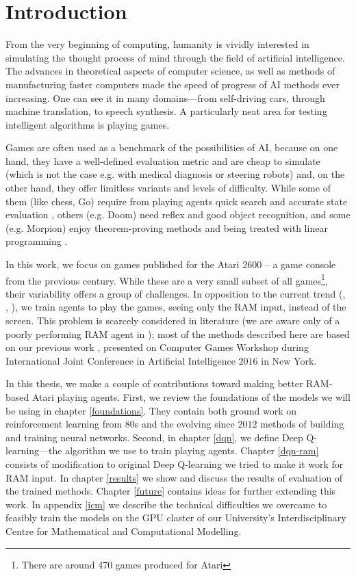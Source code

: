 \chapter*{Introduction}
From the very beginning of computing, humanity is vividly interested in simulating the thought process of mind through the field of artificial intelligence. The advances in theoretical aspects of computer science, as well as methods of manufacturing faster computers made the speed of progress of AI methods ever increasing. One can see it in many domains---from self-driving cars, through machine translation, to speech synthesis. A particularly neat area for testing intelligent algorithms is playing games.

Games are often used as a benchmark of the possibilities of AI, because on one hand, they have a well-defined evaluation metric and are cheap to simulate (which is not the case e.g. with medical diagnosis or steering robots) and, on the other hand, they offer limitless variants and levels of difficulty. While some of them (like chess, Go) require from playing agents quick search and accurate state evaluation \cite{alphago}, others (e.g. Doom) need reflex and good object recognition, and some (e.g. Morpion) enjoy theorem-proving methods and being treated with linear programming \cite{morpion}.


In this work, we focus on games published for the Atari 2600 -- a game console from the previous century. While these are a very small subset of all games\footnote{There are around 470 games produced for Atari}, their variability offers a group of challenges. In opposition to the current trend (\cite{nips-dqn}, \cite{nature-dqn}, \cite{a3c}), we train agents to play the games, seeing only the RAM input, instead of the screen. This problem is scarcely considered in literature (we are aware only of a poorly performing RAM agent in \cite{ale}); most of the methods described here are based on our previous work \cite{our-paper}, presented on Computer Games Workshop during International Joint Conference in Artificial Intelligence $2016$ in New York.

In this thesis, we make a couple of contributions toward making better RAM-based Atari playing agents. First, we review the foundations of the models we will be using in chapter \ref{foundations}. They contain both ground work on reinforcement learning from 80s and the evolving since $2012$ methods of building and training neural networks.
Second, in chapter \ref{dqn}, we define Deep Q-learning---the algorithm we use to train playing agents.
Chapter \ref{dqn-ram} consists of modification to original Deep Q-learning we tried to make it work for RAM input.
In chapter \ref{results} we show and discuss the results of evaluation of the trained methods.
Chapter \ref{future} contains ideas for further extending this work.
In appendix \ref{icm} we describe the technical difficulties we overcame to feasibly train the models on the GPU claster of our University's Interdisciplinary Centre for Mathematical and Computational Modelling.
\iffalse
\section*{Acknowledgements}
\addcontentsline{toc}{section}{Acknowledgements}
First of all, I would like to thank dr hab. Henryk Michalewski 
\todo{Acknolegments to Marc, Henryk, ICM \& Deepsense.io}
\fi
